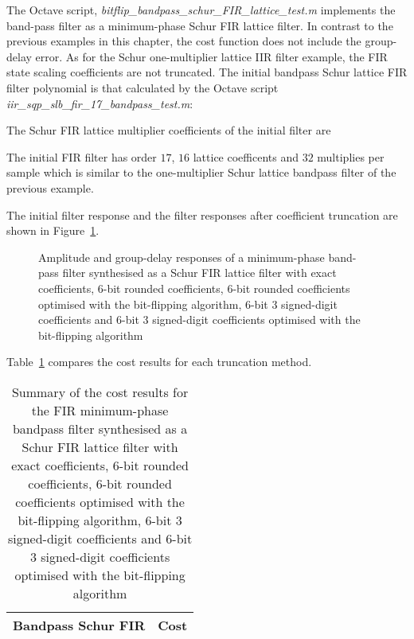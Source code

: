 \documentclass[a4paper,twoside,10pt,english]{report}
\begin{document}
The Octave script, \emph{bitflip\_bandpass\_schur\_FIR\_lattice\_test.m}
implements the band-pass filter as a minimum-phase Schur FIR lattice filter.
In contrast to the previous examples in this chapter, the cost function does 
not include the group-delay error. As for the Schur one-multiplier lattice IIR
filter example, the FIR state scaling coefficients are not truncated. The
initial bandpass Schur lattice FIR filter polynomial is that calculated by the
Octave script \emph{iir\_sqp\_slb\_fir\_17\_bandpass\_test.m}:
\begin{small}

\end{small}
The Schur FIR lattice multiplier coefficients of the initial filter are
\begin{small}

\end{small}
The initial FIR filter has order $17$, $16$ lattice coefficents and $32$ 
multiplies per sample which is similar to the one-multiplier Schur lattice 
bandpass filter of the previous example. 

The initial filter response and the filter responses 
after coefficient truncation are shown in 
Figure~\ref{fig:bitflip-bandpass-schur-FIR-lattice-response}.
\begin{figure}[!htbp]
\begin{center}
\scalebox{0.7}{}
\caption{Amplitude and group-delay responses of a minimum-phase band-pass filter
synthesised as a Schur FIR lattice filter with exact coefficients, 6-bit
rounded coefficients, 6-bit rounded coefficients optimised with the 
bit-flipping algorithm, 6-bit 3 signed-digit coefficients and 6-bit 
3 signed-digit coefficients optimised with the bit-flipping algorithm}
\label{fig:bitflip-bandpass-schur-FIR-lattice-response}
\end{center}
\end{figure}

Table~\ref{tab:bitflip-bandpass-schur-FIR-lattice-cost-summary} compares the
cost results for each truncation method. 
\begin{table}[htb]
\centering
\begin{threeparttable}
\begin{tabular}{lr}  \\ \toprule
Bandpass Schur FIR & Cost \\ \midrule

\bottomrule
\end{tabular}
\end{threeparttable}
\caption[Summary of cost results for the Schur FIR minimum-phase 
bandpass filter bit-flipping algorithm example]
{Summary of the cost results for the FIR
minimum-phase bandpass filter synthesised as a Schur FIR lattice filter with
exact coefficients, 6-bit rounded coefficients, 6-bit rounded coefficients
optimised with the bit-flipping algorithm, 6-bit 3 signed-digit coefficients
and 6-bit 3 signed-digit coefficients optimised with the bit-flipping
algorithm}
\label{tab:bitflip-bandpass-schur-FIR-lattice-cost-summary}
\end{table}
\end{document}
